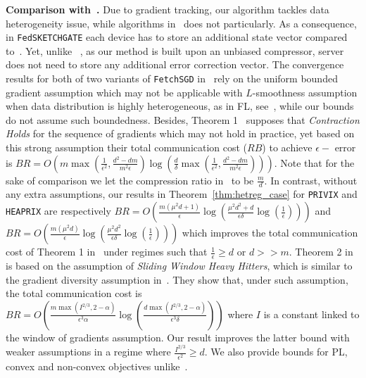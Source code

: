 \documentclass[twoside]{article}
\begin{document}
\vspace{0.05in}\noindent\textbf{Comparison with~\cite{rothchild2020fetchsgd}.}
Due to gradient tracking, our algorithm tackles data heterogeneity issue, while algorithms in~\cite{rothchild2020fetchsgd} does not particularly. 
As a consequence, in \texttt{FedSKETCHGATE} each device has to store an additional state vector compared to~\cite{rothchild2020fetchsgd}. 
Yet, unlike ~\cite{rothchild2020fetchsgd}, as our method is built upon an unbiased compressor, server does not need to store any additional error correction vector.
The convergence results for both of two variants of \texttt{FetchSGD} in~\cite{rothchild2020fetchsgd} rely on the uniform bounded gradient assumption which may not be applicable with $L$-smoothness assumption when data distribution is highly heterogeneous, as in FL, see~\cite{bayoumi2020tighter}, while our bounds do not assume such boundedness.
Besides, Theorem 1~\cite{rothchild2020fetchsgd} supposes that \emph{Contraction Holds} for the sequence of gradients which may not hold in practice, yet based on this strong assumption their total communication cost ($RB$) to achieve $\epsilon-$ error is  $BR=O\left(m\max(\frac{1}{\epsilon^2},\frac{d^2-dm}{m^2\epsilon})\log\left(\frac{d}{\delta}\max(\frac{1}{\epsilon^2},\frac{d^2-dm}{m^2\epsilon})\right)\right)$.
Note that for the sake of comparison we let the compression ratio in~\cite{rothchild2020fetchsgd} to be $\frac{m}{d}$. 
In contrast, without any extra assumptions, our results in Theorem~\ref{thm:hetreg_case} for \texttt{PRIVIX} and \texttt{HEAPRIX} are respectively $BR=O(\frac{m(\mu^2d+1)}{\epsilon}\log(\frac{\mu^2d^2+d}{\epsilon\delta}\log(\frac{1}{\epsilon})))$ and $BR=O(\frac{m(\mu^2d)}{\epsilon}\log(\frac{\mu^2d^2}{\epsilon\delta}\log(\frac{1}{\epsilon})))$ which improves the total communication cost of Theorem 1 in~\cite{rothchild2020fetchsgd} under regimes such that $\frac{1}{\epsilon}\geq d$ or $d>>m$. 
Theorem 2 in~\cite{rothchild2020fetchsgd} is based on the assumption of \emph{Sliding Window Heavy Hitters}, which is similar to the gradient diversity assumption in~\cite{li2018federated,haddadpour2019convergence}. 
They show that, under such assumption, the total communication cost is $BR=O\left(\frac{m\max(I^{2/3},2-\alpha)}{\epsilon^3\alpha}\log\left(\frac{d\max(I^{2/3},2-\alpha)}{\epsilon^3\delta}\right)\right)$ where $I$ is a constant linked to the window of gradients assumption.
Our result improves the latter bound with weaker assumptions in a regime where $\frac{I^{2/3}}{\epsilon^2}\geq d$. 
We also provide bounds for PL, convex and non-convex objectives unlike~\cite{rothchild2020fetchsgd}.
\end{document}

